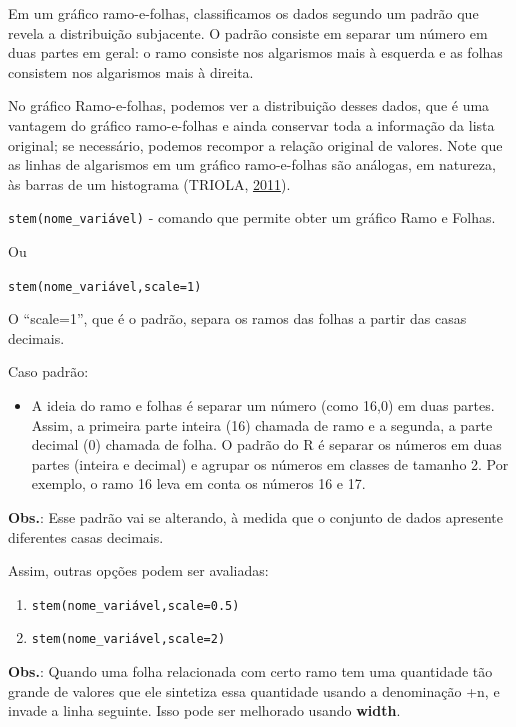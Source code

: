 \documentclass[12pt,brazil,oneside]{book}
\providecommand{\tightlist}{%
  \setlength{\itemsep}{0pt}\setlength{\parskip}{0pt}}
\begin{document}
Em um gráfico ramo-e-folhas, classificamos os dados segundo um padrão que revela a distribuição subjacente. O padrão consiste em separar um número em duas partes em geral: o ramo consiste nos algarismos mais à esquerda e as folhas consistem nos algarismos mais à direita.

No gráfico Ramo-e-folhas, podemos ver a distribuição desses dados, que é uma vantagem do gráfico ramo-e-folhas e ainda conservar toda a informação da lista original; se necessário, podemos recompor a relação original de valores. Note que as linhas de algarismos em um gráfico ramo-e-folhas são análogas, em natureza, às barras de um histograma (TRIOLA, \protect\hyperlink{ref-triola1999}{2011}).

\texttt{stem(nome\_variável)} - comando que permite obter um gráfico Ramo e Folhas.

Ou

\texttt{stem(nome\_variável,scale=1)}

O ``scale=1'', que é o padrão, separa os ramos das folhas a partir das casas decimais.

Caso padrão:

\begin{itemize}
\tightlist
\item
  A ideia do ramo e folhas é separar um número (como 16,0) em duas partes. Assim, a primeira parte inteira (16) chamada de ramo e a segunda, a parte decimal (0) chamada de folha. O padrão do R é separar os números em duas partes (inteira e decimal) e agrupar os números em classes de tamanho 2. Por exemplo, o ramo 16 leva em conta os números 16 e 17.
\end{itemize}

\textbf{Obs.}: Esse padrão vai se alterando, à medida que o conjunto de dados apresente diferentes casas decimais.

Assim, outras opções podem ser avaliadas:

\begin{enumerate}
\def\labelenumi{\alph{enumi})}
\item
  \texttt{stem(nome\_variável,scale=0.5)}
\item
  \texttt{stem(nome\_variável,scale=2)}
\end{enumerate}

\textbf{Obs.}: Quando uma folha relacionada com certo ramo tem uma quantidade tão grande de valores que ele sintetiza essa quantidade usando a denominação +n, e invade a linha seguinte. Isso pode ser melhorado usando \textbf{width}.
\end{document}

